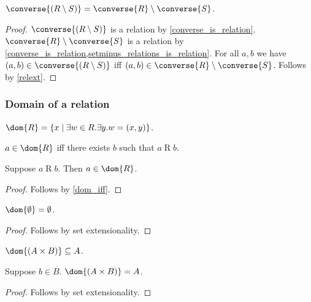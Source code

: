 \begin{proposition}\label{converse_setminus}
    $\converse{(R\setminus S)} = \converse{R}\setminus\converse{S}$.
\end{proposition}
\begin{proof}
    $\converse{(R\setminus S)}$ is a relation by \cref{converse_is_relation}.
    $\converse{R}\setminus\converse{S}$ is a relation by \cref{converse_is_relation,setminus_relations_is_relation}.
    For all $a,b$ we have $(a,b)\in\converse{(R\setminus S)}$ iff $(a,b)\in\converse{R}\setminus\converse{S}$.
    Follows by \cref{relext}.
\end{proof}



\subsubsection{Domain of a relation}

\begin{definition}\label{dom}
    $\dom{R} = \{ x\mid \exists w\in R. \exists y. w = (x, y)\}$.
\end{definition}

\begin{proposition}\label{dom_iff}
    $a\in\dom{R}$ iff there exists $b$ such that $a\mathrel{R} b$.
\end{proposition}

\begin{proposition}\label{dom_intro}
    Suppose $a\mathrel{R} b$.
    Then $a\in\dom{R}$.
\end{proposition}
\begin{proof}
    Follows by \cref{dom_iff}.
\end{proof}

\begin{proposition}\label{dom_emptyset}
    $\dom{\emptyset} = \emptyset$.
\end{proposition}
\begin{proof}
    Follows by set extensionality.
\end{proof}

\begin{proposition}\label{dom_times}
    $\dom{(A\times B)}\subseteq A$.
\end{proposition}

\begin{proposition}\label{dom_times_inhabited}
    Suppose $b\in B$.
    $\dom{(A\times B)} = A$.
\end{proposition}
\begin{proof}
    Follows by set extensionality.
\end{proof}


